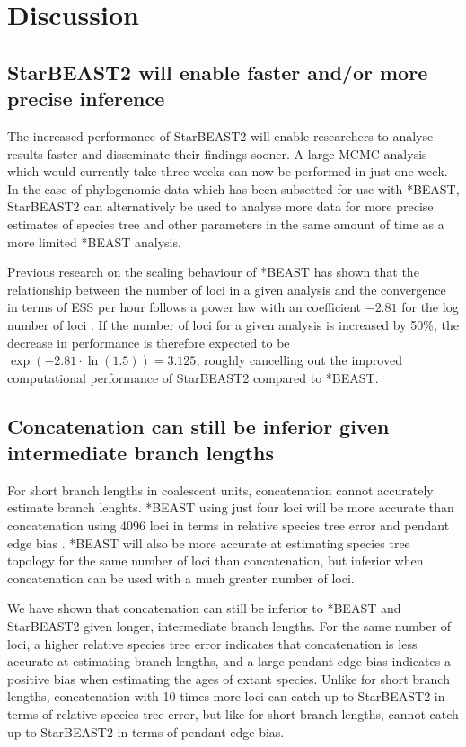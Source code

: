 \documentclass[12pt]{article}
\begin{document}
\clearpage

\section*{Discussion}

\subsection*{StarBEAST2 will enable faster and/or more precise inference}

The increased performance of StarBEAST2 will enable researchers to analyse
results faster and disseminate their findings sooner. A large MCMC analysis
which would currently take three weeks can now be performed in just one week. In
the case of phylogenomic data which has been subsetted for use with *BEAST,
StarBEAST2 can alternatively be used to analyse more data for more precise
estimates of species tree and other parameters in the same amount of time as a
more limited *BEAST analysis.

Previous research on the scaling behaviour of *BEAST has shown that the
relationship between the number of loci in a given analysis and the convergence
in terms of ESS per hour follows a power law with an coefficient $-2.81$ for the
log number of loci \citep{Ogilvie01052016}. If the number of loci for a given
analysis is increased by 50\%, the decrease in performance is therefore expected
to be $\exp(-2.81 \cdot \ln(1.5)) = 3.125$, roughly cancelling out the improved
computational performance of StarBEAST2 compared to *BEAST.

\subsection*{Concatenation can still be inferior given intermediate branch lengths}

For short branch lengths in coalescent units, concatenation cannot accurately
estimate branch lenghts. *BEAST using just four loci will be more accurate than
concatenation using 4096 loci in terms in relative species tree error and
pendant edge bias \citep{Ogilvie01052016}. *BEAST will also be more accurate at
estimating species tree topology for the same number of loci than concatenation,
but inferior when concatenation can be used with a much greater number of loci.

We have shown that concatenation can still be inferior to *BEAST and StarBEAST2
given longer, intermediate branch lengths. For the same number of loci, a higher
relative species tree error indicates that concatenation is less accurate at
estimating branch lengths, and a large pendant edge bias indicates a positive bias when
estimating the ages of extant species. Unlike for short branch lengths,
concatenation with 10 times more loci can catch up to StarBEAST2 in terms of relative
species tree error, but like for short branch lengths, cannot catch up to StarBEAST2
in terms of pendant edge bias.
\end{document}

